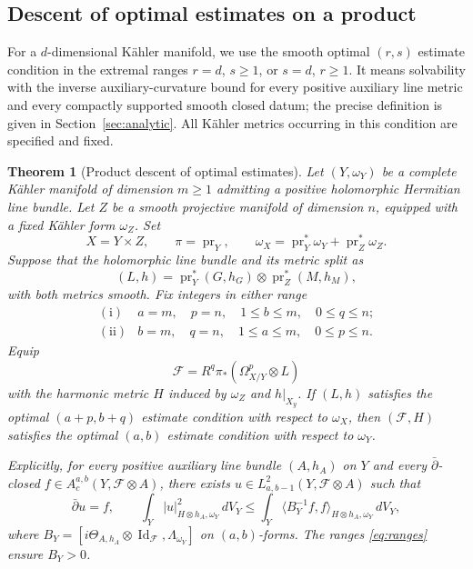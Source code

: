 \documentclass[11pt,reqno]{amsart}
\numberwithin{equation}{section}
\newtheorem{theorem}{Theorem}[section]
\theoremstyle{definition}
\theoremstyle{remark}
\newcommand{\db}{\bar\partial}
\newcommand{\cF}{\mathcal F}
\newcommand{\Id}{\operatorname{Id}}
\newcommand{\ip}[2]{\langle #1,#2\rangle}
\begin{document}
\subsection{Descent of optimal estimates on a product}
For a $d$-dimensional K\"ahler manifold, we use the smooth optimal $(r,s)$ estimate condition in the extremal ranges $r=d$, $s\geq1$, or $s=d$, $r\geq1$. It means solvability with the inverse auxiliary-curvature bound for every positive auxiliary line metric and every compactly supported smooth closed datum; the precise definition is given in Section~\ref{sec:analytic}. All K\"ahler metrics occurring in this condition are specified and fixed.

\begin{theorem}[Product descent of optimal estimates]\label{thm:product-descent}
Let $(Y,\omega_Y)$ be a complete K\"ahler manifold of dimension $m\geq1$ admitting a positive holomorphic Hermitian line bundle. Let $Z$ be a smooth projective manifold of dimension $n$, equipped with a fixed K\"ahler form $\omega_Z$. Set
\[
 X=Y\times Z,\qquad \pi=\operatorname{pr}_Y,\qquad
 \omega_X=\operatorname{pr}_Y^*\omega_Y+
                 \operatorname{pr}_Z^*\omega_Z.
\]
Suppose that the holomorphic line bundle and its metric split as
\[
 (L,h)=\operatorname{pr}_Y^*(G,h_G)\otimes
               \operatorname{pr}_Z^*(M,h_M),
\]
with both metrics smooth. Fix integers in either range
\begin{equation}\label{eq:ranges}
\begin{array}{ll}
\mathrm{(i)}&a=m,\quad p=n,\quad 1\leq b\leq m,\quad 0\leq q\leq n;\\[2pt]
\mathrm{(ii)}&b=m,\quad q=n,\quad 1\leq a\leq m,\quad 0\leq p\leq n.
\end{array}
\end{equation}
Equip
\[
 \cF=R^q\pi_*(\Omega^p_{X/Y}\otimes L)
\]
with the harmonic metric $H$ induced by $\omega_Z$ and $h|_{X_y}$.
If $(L,h)$ satisfies the optimal $(a+p,b+q)$ estimate condition with respect to $\omega_X$, then $(\cF,H)$ satisfies the optimal $(a,b)$ estimate condition with respect to $\omega_Y$.

Explicitly, for every positive auxiliary line bundle $(A,h_A)$ on $Y$ and every $\db$-closed
$f\in A_c^{a,b}(Y,\cF\otimes A)$, there exists
$u\in L^2_{a,b-1}(Y,\cF\otimes A)$ such that
\begin{equation}\label{eq:main-product-estimate}
 \db u=f,\qquad
 \int_Y|u|_{H\otimes h_A,\omega_Y}^2\,dV_Y
 \leq\int_Y\ip{B_Y^{-1}f}{f}_{H\otimes h_A,\omega_Y}\,dV_Y,
\end{equation}
where $B_Y=[i\Theta_{A,h_A}\otimes\Id_{\cF},\Lambda_{\omega_Y}]$ on $(a,b)$-forms. The ranges \eqref{eq:ranges} ensure $B_Y>0$.
\end{theorem}
\end{document}
